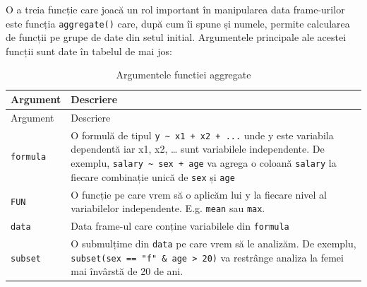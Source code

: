 \documentclass[]{article}
\begin{document}
O a treia funcție care joacă un rol important în manipularea data
frame-urilor este funcția \texttt{aggregate()} care, după cum îi spune
și numele, permite calcularea de funcții pe grupe de date din setul
initial. Argumentele principale ale acestei funcții sunt date în tabelul
de mai jos:

\begin{longtable}[]{@{}ll@{}}
\caption{Argumentele functiei aggregate}\tabularnewline
\toprule
\begin{minipage}[b]{0.18\columnwidth}\raggedright\strut
Argument\strut
\end{minipage} & \begin{minipage}[b]{0.67\columnwidth}\raggedright\strut
Descriere\strut
\end{minipage}\tabularnewline
\midrule
\endfirsthead
\toprule
\begin{minipage}[b]{0.18\columnwidth}\raggedright\strut
Argument\strut
\end{minipage} & \begin{minipage}[b]{0.67\columnwidth}\raggedright\strut
Descriere\strut
\end{minipage}\tabularnewline
\midrule
\endhead
\begin{minipage}[t]{0.18\columnwidth}\raggedright\strut
\texttt{formula}\strut
\end{minipage} & \begin{minipage}[t]{0.67\columnwidth}\raggedright\strut
O formulă de tipul \texttt{y\ \textasciitilde{}\ x1\ +\ x2\ +\ ...} unde
y este variabila dependentă iar x1, x2, \ldots{} sunt variabilele
independente. De exemplu,
\texttt{salary\ \textasciitilde{}\ sex\ +\ age} va agrega o coloană
\texttt{salary} la fiecare combinație unică de \texttt{sex} și
\texttt{age}\strut
\end{minipage}\tabularnewline
\begin{minipage}[t]{0.18\columnwidth}\raggedright\strut
\texttt{FUN}\strut
\end{minipage} & \begin{minipage}[t]{0.67\columnwidth}\raggedright\strut
O funcție pe care vrem să o aplicăm lui y la fiecare nivel al
variabilelor independente. E.g. \texttt{mean} sau \texttt{max}.\strut
\end{minipage}\tabularnewline
\begin{minipage}[t]{0.18\columnwidth}\raggedright\strut
\texttt{data}\strut
\end{minipage} & \begin{minipage}[t]{0.67\columnwidth}\raggedright\strut
Data frame-ul care conține variabilele din \texttt{formula}\strut
\end{minipage}\tabularnewline
\begin{minipage}[t]{0.18\columnwidth}\raggedright\strut
\texttt{subset}\strut
\end{minipage} & \begin{minipage}[t]{0.67\columnwidth}\raggedright\strut
O submulțime din \texttt{data} pe care vrem să le analizăm. De exemplu,
\texttt{subset(sex\ ==\ "f"\ \&\ age\ \textgreater{}\ 20)} va restrânge
analiza la femei mai învârstă de 20 de ani.\strut
\end{minipage}\tabularnewline
\bottomrule
\end{longtable}
\end{document}
